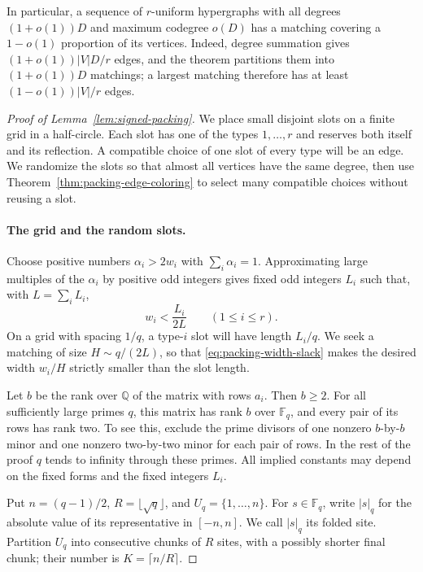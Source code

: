 In particular, a sequence of $r$-uniform hypergraphs with all degrees
$(1+o(1))D$ and maximum codegree $o(D)$ has a matching covering a
$1-o(1)$ proportion of its vertices.  Indeed, degree summation gives
$(1+o(1))|V|D/r$ edges, and the theorem partitions them into
$(1+o(1))D$ matchings; a largest matching therefore has at least
$(1-o(1))|V|/r$ edges.

\begin{proof}[Proof of Lemma~\ref{lem:signed-packing}]
We place small disjoint slots on a finite grid in a half-circle.  Each
slot has one of the types $1,\ldots,r$ and reserves both itself and its
reflection.  A compatible choice of one slot of every type will be an
edge.  We randomize the slots so that almost all vertices have the same
degree, then use Theorem~\ref{thm:packing-edge-coloring} to select many
compatible choices without reusing a slot.

\paragraph{The grid and the random slots.}
Choose positive numbers $\alpha_i>2w_i$ with $\sum_i\alpha_i=1$.
Approximating large multiples of the $\alpha_i$ by positive odd integers
gives fixed odd integers $L_i$ such that, with $L=\sum_i L_i$,
\begin{equation}
 w_i<\frac{L_i}{2L}\qquad(1\le i\le r).
 \label{eq:packing-width-slack}
\end{equation}
On a grid with spacing $1/q$, a type-$i$ slot will have length $L_i/q$.
We seek a matching of size $H\sim q/(2L)$, so that
\eqref{eq:packing-width-slack} makes the desired width $w_i/H$ strictly
smaller than the slot length.

Let $b$ be the rank over $\mathbb Q$ of the matrix with rows $a_i$.
Then $b\ge2$.  For all sufficiently large primes $q$, this matrix has
rank $b$ over $\mathbb F_q$, and every pair of its rows has rank two.
To see this, exclude the prime divisors of one nonzero $b$-by-$b$ minor
and one nonzero two-by-two minor for each pair of rows.  In the rest of
the proof $q$ tends to infinity through these primes.  All implied
constants may depend on the fixed forms and the fixed integers $L_i$.

Put $n=(q-1)/2$, $R=\lfloor\sqrt q\rfloor$, and
$U_q=\{1,\ldots,n\}$.  For $s\in\mathbb F_q$, write $|s|_q$ for the
absolute value of its representative in $[-n,n]$.  We call $|s|_q$ its
folded site.  Partition $U_q$ into consecutive chunks of $R$ sites, with
a possibly shorter final chunk; their number is $K=\lceil n/R\rceil$.


\end{proof}
